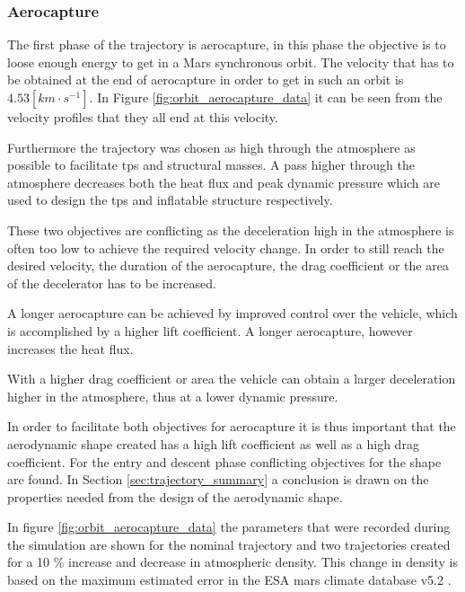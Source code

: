 \subsubsection{Aerocapture} \label{sec:aerocapture}
The first phase of the trajectory is aerocapture, in this phase the objective is to loose enough energy to get in a Mars synchronous orbit. The velocity that has to be obtained at the end of aerocapture in order to get in such an orbit is $4.53 \left[km \cdot s^{-1}\right]$. In Figure \ref{fig:orbit_aerocapture_data} it can be seen from the velocity profiles that they all end at this velocity.

Furthermore the trajectory was chosen as high through the atmosphere as possible to facilitate \gls{tps} and structural masses. A pass higher through the atmosphere decreases both the heat flux and peak dynamic pressure which are used to design the \gls{tps} and inflatable structure respectively.

These two objectives are conflicting as the deceleration high in the atmosphere is often too low to achieve the required velocity change. In order to still reach the desired velocity, the duration of the aerocapture, the drag coefficient or the area of the decelerator has to be increased. 

A longer aerocapture can be achieved by improved control over the vehicle, which is accomplished by a higher lift coefficient.  A longer aerocapture, however increases the heat flux. 

With a higher drag coefficient or area the vehicle can obtain a larger deceleration higher in the atmosphere, thus at a lower dynamic pressure.

In order to facilitate both objectives for aerocapture it is thus important that the aerodynamic shape created has a high lift coefficient as well as a high drag coefficient. For the entry and descent phase conflicting objectives for the shape are found. In Section \ref{sec:trajectory_summary} a conclusion is drawn on the properties needed from the design of the aerodynamic shape.

In figure \ref{fig:orbit_aerocapture_data} the parameters that were recorded during the simulation are shown for the nominal trajectory and two trajectories created for a 10 \% increase and decrease in atmospheric density. This change in density is based on the maximum estimated error in the ESA mars climate database v5.2 \cite{Lewis2015}.


